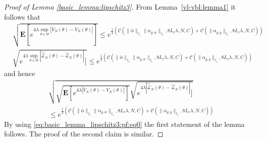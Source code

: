 \documentclass{article}
\newcommand{\bE}{\mathbf{E}}
\begin{document}
\begin{proof}[Proof of Lemma \ref{basic_lemma:lipschitz3}]
 
 From Lemma~\ref{vl-vbl:lemma1} %
 it follows that 
 \[
   \begin{aligned}
      & \sqrt{\bE[e^{4\lambda \sup_{\theta \in \Theta} |\bar{V}_N(\theta)-V_N(\theta)|}]} \le e^{\frac{1}{4}(\mathcal{C}(\|\bar{\alpha}\|_{\ell_1}\|\alpha_{g,w}\|_{\ell_1}, 8L_{\ell}\lambda,N,C)+\mathcal{C}(\|\alpha_{g,y}\|_{\ell_1}, 8L_{\ell}\lambda,N,C))} \\
      &  \sqrt{e^{4\lambda \sup_{\theta \in \Theta} |\hat{\bar{\mathcal{L}}}_N(\theta)-\hat{\mathcal{L}}_N(\theta)|}]} \le e^{\frac{1}{4}(\mathcal{C}(\|\bar{\alpha}\|_{\ell_1}\|\alpha_{g,w}\|_{\ell_1}, 8L_{\ell}\lambda,N,C)+\mathcal{C}(\|\alpha_{g,y}\|_{\ell_1}, 8L_{\ell}\lambda,N,C))}
    \end{aligned}    
 \]
 and hence 
\begin{multline*} 
\sqrt{\sqrt{\bE[e^{4\lambda |\bar{V}_N(\theta)-V_N(\theta)|}]} \sqrt{e^{4\lambda |\hat{\bar{\mathcal{L}}}_N(\theta)-\hat{\mathcal{L}}_N(\theta)|}]}}\\ 
\le e^{\frac{1}{4}(\mathcal{C}(\|\bar{\alpha}\|_{\ell_1}\|\alpha_{g,w}\|_{\ell_1}, 8L_{\ell}\lambda,N,C)+\mathcal{C}(\|\alpha_{g,y}\|_{\ell_1}, 8L_{\ell}\lambda,N,C))}
\end{multline*}
By using \eqref{eq:basic_lemma_lipschitz3:pf:eq0} the first statement of the lemma follows.
The proof of the second claim is similar. 

\end{proof}
\end{document}
